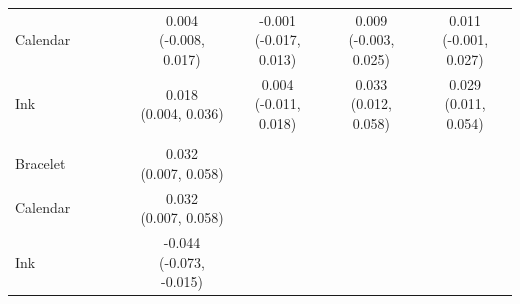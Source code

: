 {\begin{tabular}[t]{lcccccccc}
\addlinespace \addlinespace \hspace{1em}Calendar &  &  &  &  & \makecell[c]{0.004\\(-0.008, 0.017)} & \makecell[c]{-0.001\\(-0.017, 0.013)} & \makecell[c]{0.009\\(-0.003, 0.025)} & \makecell[c]{0.011\\(-0.001, 0.027)}\\
\addlinespace \addlinespace \hspace{1em}Ink &  &  &  &  & \makecell[c]{0.018\\(0.004, 0.036)} & \makecell[c]{0.004\\(-0.011, 0.018)} & \makecell[c]{0.033\\(0.012, 0.058)} & \makecell[c]{0.029\\(0.011, 0.054)}\\
\addlinespace \addlinespace \addlinespace[0.3em]
\hline
\multicolumn{9}{l}{\textit{\textbf{Panel C: Private}}}\\
\hline
\hspace{1em}Bracelet &  &  &  &  & \makecell[c]{0.032\\(0.007, 0.058)} &  &  & \\
\addlinespace \addlinespace \hspace{1em}Calendar &  &  &  &  & \makecell[c]{0.032\\(0.007, 0.058)} &  &  & \\
\addlinespace \addlinespace \hspace{1em}Ink &  &  &  &  & \makecell[c]{-0.044\\(-0.073, -0.015)} &  &  & \\
\bottomrule
\end{tabular}}

